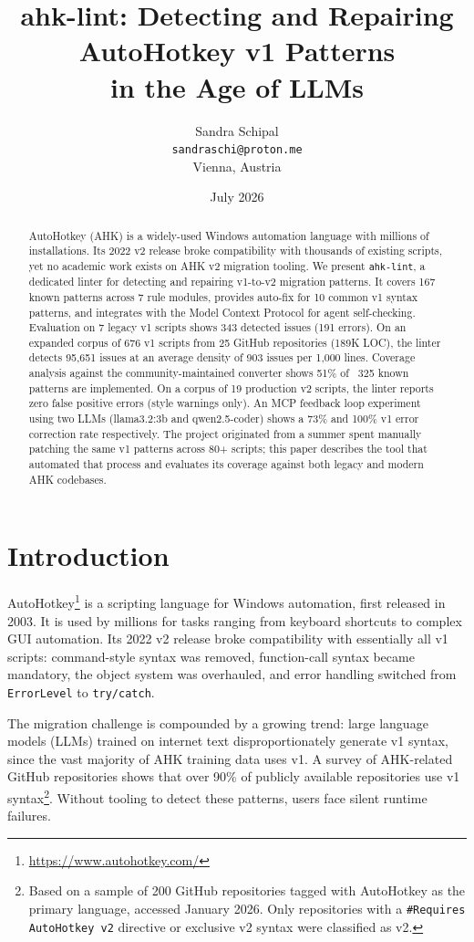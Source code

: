 \documentclass[11pt,a4paper]{article}
\title{ahk-lint: Detecting and Repairing AutoHotkey v1 Patterns \\ in the Age of LLMs}
\author{Sandra Schipal \\ \texttt{sandraschi@proton.me} \\ Vienna, Austria}
\date{July 2026}
\begin{document}
\maketitle

\begin{abstract}
AutoHotkey (AHK) is a widely-used Windows automation language with millions of installations. Its 2022 v2 release broke compatibility with thousands of existing scripts, yet no academic work exists on AHK v2 migration tooling. We present \texttt{ahk-lint}, a dedicated linter for detecting and repairing v1-to-v2 migration patterns. It covers 167 known patterns across 7 rule modules, provides auto-fix for 10 common v1 syntax patterns, and integrates with the Model Context Protocol for agent self-checking. Evaluation on 7 legacy v1 scripts shows 343 detected issues (191 errors). On an expanded corpus of 676 v1 scripts from 25 GitHub repositories (189K LOC), the linter detects 95,651 issues at an average density of 903 issues per 1,000 lines. Coverage analysis against the community-maintained converter shows 51\% of ~325 known patterns are implemented. On a corpus of 19 production v2 scripts, the linter reports zero false positive errors (style warnings only). An MCP feedback loop experiment using two LLMs (llama3.2:3b and qwen2.5-coder) shows a 73\% and 100\% v1 error correction rate respectively. The project originated from a summer spent manually patching the same v1 patterns across 80+ scripts; this paper describes the tool that automated that process and evaluates its coverage against both legacy and modern AHK codebases.
\end{abstract}

\section{Introduction}

AutoHotkey\footnote{\url{https://www.autohotkey.com/}} is a scripting language for Windows automation, first released in 2003. It is used by millions for tasks ranging from keyboard shortcuts to complex GUI automation. Its 2022 v2 release broke compatibility with essentially all v1 scripts: command-style syntax was removed, function-call syntax became mandatory, the object system was overhauled, and error handling switched from \texttt{ErrorLevel} to \texttt{try/catch}.

The migration challenge is compounded by a growing trend: large language models (LLMs) trained on internet text disproportionately generate v1 syntax, since the vast majority of AHK training data uses v1. A survey of AHK-related GitHub repositories shows that over 90\% of publicly available repositories use v1 syntax\footnote{Based on a sample of 200 GitHub repositories tagged with AutoHotkey as the primary language, accessed January 2026. Only repositories with a \texttt{#Requires AutoHotkey v2} directive or exclusive v2 syntax were classified as v2.}. Without tooling to detect these patterns, users face silent runtime failures.
\end{document}
